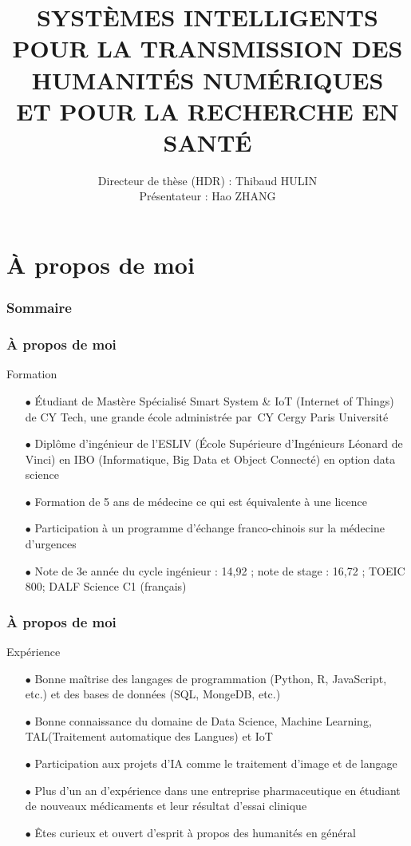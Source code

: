\documentclass[xcolor=dvipsnames]{beamer}
\title[SYSTÈMES INTELLIGENTS]{\textsc{SYSTÈMES INTELLIGENTS \\\normalsize{POUR LA TRANSMISSION DES \\HUMANITÉS NUMÉRIQUES \\ET POUR LA RECHERCHE EN SANTÉ}}}
\institute{\large{\texttt{LECLA}}}
\author{Directeur de thèse (HDR) : Thibaud HULIN
\\Présentateur : Hao ZHANG}
\date{\displaydate{date}}
\begin{document}
\begin{frame}
	\titlepage
\end{frame}

\section{À propos de moi}

\begin{frame}
	\frametitle{Sommaire}
	\tableofcontents[currentsection]
\end{frame}

\begin{frame}[fragile]
	\frametitle{À propos de moi}
		\begin{block}{Formation}
			\small{
			\begin{itemize}
				\item[$\bullet$]Étudiant de Mastère Spécialisé Smart System \& IoT (Internet of Things) de CY Tech, une grande école administrée par CY Cergy Paris Université
				\item[$\bullet$]Diplôme d'ingénieur de l'ESLIV (École Supérieure d'Ingénieurs Léonard de Vinci) en IBO (Informatique, Big Data et Object Connecté) en option data science
				\item[$\bullet$]Formation de 5 ans de médecine ce qui est équivalente à une licence
				\item[$\bullet$]Participation à un programme d'échange franco-chinois sur la médecine d'urgences
				\item[$\bullet$]Note de 3e année du cycle ingénieur : 14,92 ; note de stage : 16,72 ; TOEIC 800; DALF Science C1 (français)  
			\end{itemize}}
		\end{block}
\vspace{1.2cm}
\end{frame}

\begin{frame}[fragile]
\frametitle{À propos de moi}
\begin{block}{Expérience}
	\small{
	\begin{itemize}
		\item[$\bullet$]Bonne maîtrise des langages de programmation (Python, R, JavaScript, etc.) et des bases de données (SQL, MongeDB, etc.)
		\item[$\bullet$]Bonne connaissance du domaine de Data Science, Machine Learning, TAL(Traitement automatique des Langues) et IoT
		\item[$\bullet$]Participation aux projets d'IA comme le traitement d'image et de langage
		\item[$\bullet$]Plus d'un an d'expérience dans une entreprise pharmaceutique en étudiant de nouveaux médicaments et leur résultat d'essai clinique
		\item[$\bullet$]Êtes curieux et ouvert d'esprit à propos des humanités en général
	\end{itemize}}
\end{block}
\vspace{1.1cm}
\end{frame}
\end{document}
